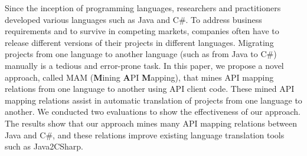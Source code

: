 Since the inception of programming languages, researchers and practitioners developed various languages such as Java and C\#. To address business requirements and to survive in competing markets,
companies often have to release different versions of their projects in different languages. Migrating projects from one language to another language (such as from Java to C\#) manually is a tedious
and error-prone task. In this paper, we propose a novel approach, called MAM (\textbf{M}ining \textbf{A}PI
\textbf{M}apping), that mines API mapping relations from one language to another using API client code. 
These mined API mapping relations assist in automatic translation of projects from one language to another. We conducted two evaluations to show the effectiveness
of our approach. The results show that our approach mines many API mapping relations between Java and C\#, and these relations improve existing language translation tools such as Java2CSharp.